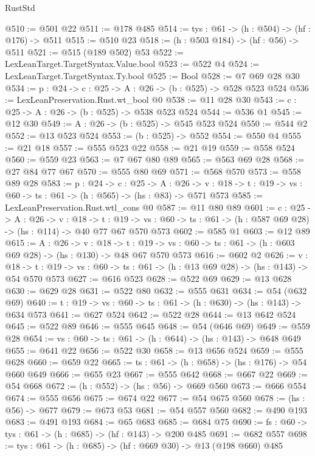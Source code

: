 \begin{lexlean}{RustStd}
\begin{coremodule}
@510 := @501 @22
@511 := @178 @485
@514 := {tys : @61} -> (h : @504) -> (hf : @176) -> @511
@515 := @510 @23
@518 := (h : @503 @184) -> (hf : @56) -> @511
@521 := @515 (@189 @502) @53
@522 := LexLeanTarget.TargetSyntax.Value.bool
@523 := @522 @4
@524 := LexLeanTarget.TargetSyntax.Ty.bool
@525 := Bool
@528 := @7 @69 @28 @30
@534 := {p : @24} -> {c : @25} -> {A : @26} -> (b : @525) -> @528 @523 @524
@536 := LexLeanPreservation.Rust.wt_bool @0
@538 := @11 @28 @30
@543 := {c : @25} -> {A : @26} -> (b : @525) -> @538 @523 @524
@544 := @536 @1
@545 := @12 @30
@549 := {A : @26} -> (b : @525) -> @545 @523 @524
@550 := @544 @2
@552 := @13 @523 @524
@553 := (b : @525) -> @552
@554 := @550 @4
@555 := @21 @18
@557 := @555 @523 @22
@558 := @21 @19
@559 := @558 @524
@560 := @559 @23
@563 := @7 @67 @80 @89
@565 := @563 @69 @28
@568 := @27 @84 @77 @67
@570 := @555 @80 @69
@571 := @568 @570
@573 := @558 @89 @28
@583 := {p : @24} ->
  {c : @25} ->
  {A : @26} ->
  {v : @18} -> {t : @19} -> {vs : @60} -> {ts : @61} -> (h : @565) -> (hs : @83) -> @571 @573
@585 := LexLeanPreservation.Rust.wtl_cons @0
@587 := @11 @80 @89
@601 := {c : @25} ->
  {A : @26} ->
  {v : @18} ->
  {t : @19} ->
  {vs : @60} -> {ts : @61} -> (h : @587 @69 @28) -> (hs : @114) -> @40 @77 @67 @570 @573
@602 := @585 @1
@603 := @12 @89
@615 := {A : @26} ->
  {v : @18} ->
  {t : @19} -> {vs : @60} -> {ts : @61} -> (h : @603 @69 @28) -> (hs : @130) -> @48 @67 @570 @573
@616 := @602 @2
@626 := {v : @18} ->
  {t : @19} -> {vs : @60} -> {ts : @61} -> (h : @13 @69 @28) -> (hs : @143) -> @54 @570 @573
@627 := @616 @523
@628 := @522 @69
@629 := @13 @628
@630 := @629 @28
@631 := @522 @80
@632 := @555 @631
@634 := @54 (@632 @69)
@640 := {t : @19} -> {vs : @60} -> {ts : @61} -> (h : @630) -> (hs : @143) -> @634 @573
@641 := @627 @524
@642 := @522 @28
@644 := @13 @642 @524
@645 := @522 @89
@646 := @555 @645
@648 := @54 (@646 @69)
@649 := @559 @28
@654 := {vs : @60} -> {ts : @61} -> (h : @644) -> (hs : @143) -> @648 @649
@655 := @641 @22
@656 := @522 @30
@658 := @13 @656 @524
@659 := @555 @628
@660 := @659 @22
@665 := {ts : @61} -> (h : @658) -> (hs : @176) -> @54 @660 @649
@666 := @655 @23
@667 := @555 @642
@668 := @667 @22
@669 := @54 @668
@672 := (h : @552) -> (hs : @56) -> @669 @560
@673 := @666 @554
@674 := @555 @656
@675 := @674 @22
@677 := @54 @675 @560
@678 := (hs : @56) -> @677
@679 := @673 @53
@681 := @54 @557 @560
@682 := @490 @193
@683 := @491 @193
@684 := @65 @683
@685 := @684 @75
@690 := {fs : @60} -> {tys : @61} -> (h : @685) -> (hf : @143) -> @200 @485
@691 := @682 @557
@698 := {tys : @61} -> (h : @685) -> (hf : @669 @30) -> @13 (@198 @660) @485

\end{coremodule}
\end{lexlean}
